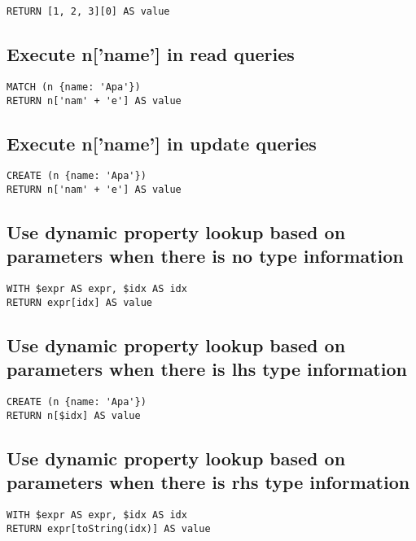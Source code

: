 \begin{lstlisting}
RETURN [1, 2, 3][0] AS value
\end{lstlisting}

\subsection{Execute n['name'] in read queries}

\begin{lstlisting}
MATCH (n {name: 'Apa'})
RETURN n['nam' + 'e'] AS value
\end{lstlisting}

\subsection{Execute n['name'] in update queries}

\begin{lstlisting}
CREATE (n {name: 'Apa'})
RETURN n['nam' + 'e'] AS value
\end{lstlisting}

\subsection{Use dynamic property lookup based on parameters when there is no type information}

\begin{lstlisting}
WITH $expr AS expr, $idx AS idx
RETURN expr[idx] AS value
\end{lstlisting}

\subsection{Use dynamic property lookup based on parameters when there is lhs type information}

\begin{lstlisting}
CREATE (n {name: 'Apa'})
RETURN n[$idx] AS value
\end{lstlisting}

\subsection{Use dynamic property lookup based on parameters when there is rhs type information}

\begin{lstlisting}
WITH $expr AS expr, $idx AS idx
RETURN expr[toString(idx)] AS value
\end{lstlisting}

